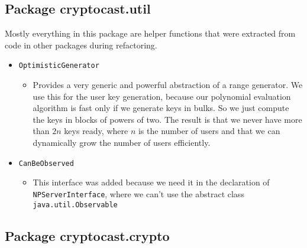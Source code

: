 \documentclass[a4paper,10pt]{scrartcl}
\begin{document}
\subsection{Package cryptocast.util}

Mostly everything in this package are helper functions that were extracted from code
in other packages during refactoring.

\begin{itemize}
  \item \lstinline|OptimisticGenerator|
  \begin{itemize}
   \item Provides a very generic and powerful abstraction of a range generator. We use this
	 for the user key generation, because our polynomial evaluation algorithm is fast only
	 if we generate keys in bulks. So we just compute the keys in blocks of powers of two.
	 The result is that we never have more than $2n$ keys ready, where $n$ is the number of users
	 and that we can dynamically grow the number of users efficiently.
  \end{itemize}

  \item \lstinline|CanBeObserved|
  \begin{itemize}
   \item This interface was added because we need it in the declaration of \lstinline|NPServerInterface|,
	 where we can't use the abstract class \lstinline|java.util.Observable|
  \end{itemize}

  \end{itemize}

\subsection{Package cryptocast.crypto}
\end{document}
